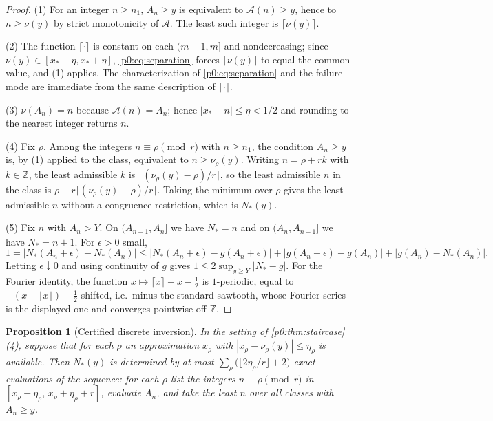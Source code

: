 \documentclass[11pt,a4paper,oneside]{book}
\theoremstyle{plain}
\newtheorem{proposition}[theorem]{Proposition}
\theoremstyle{definition}
\theoremstyle{remark}
\newcommand{\Int}{\mathbb{Z}}
\begin{document}
\begin{proof}
(1) For an integer $n\ge n_1$, $A_n\ge y$ is equivalent to
$\mathcal A(n)\ge y$, hence to $n\ge\nu(y)$ by strict monotonicity of
$\mathcal A$.  The least such integer is $\lceil\nu(y)\rceil$.

(2) The function $\lceil\cdot\rceil$ is constant on each $(m-1,m]$ and
nondecreasing; since $\nu(y)\in[x_\ast-\eta,x_\ast+\eta]$,
\eqref{p0:eq:separation} forces $\lceil\nu(y)\rceil$ to equal the common
value, and (1) applies.  The characterization of
\eqref{p0:eq:separation} and the failure mode are immediate from the same
description of $\lceil\cdot\rceil$.

(3) $\nu(A_n)=n$ because $\mathcal A(n)=A_n$; hence $|x_\ast-n|\le\eta<1/2$ and
rounding to the nearest integer returns $n$.

(4) Fix $\rho$.  Among the integers $n\equiv\rho\pmod r$ with $n\ge n_1$, the
condition $A_n\ge y$ is, by (1) applied to the class, equivalent to
$n\ge\nu_\rho(y)$.  Writing $n=\rho+rk$ with $k\in\Int$, the least admissible
$k$ is $\lceil(\nu_\rho(y)-\rho)/r\rceil$, so the least admissible $n$ in the
class is $\rho+r\lceil(\nu_\rho(y)-\rho)/r\rceil$.  Taking the minimum over
$\rho$ gives the least admissible $n$ without a congruence restriction, which
is $N_\ast(y)$.

(5) Fix $n$ with $A_n>Y$.  On $(A_{n-1},A_n]$ we have $N_\ast=n$ and on
$(A_n,A_{n+1}]$ we have $N_\ast=n+1$.  For $\epsilon>0$ small,
\[
 1=\bigl|N_\ast(A_n+\epsilon)-N_\ast(A_n)\bigr|
 \le\bigl|N_\ast(A_n+\epsilon)-g(A_n+\epsilon)\bigr|
  +\bigl|g(A_n+\epsilon)-g(A_n)\bigr|
  +\bigl|g(A_n)-N_\ast(A_n)\bigr| .
\]
Letting $\epsilon\downarrow0$ and using continuity of $g$ gives
$1\le2\sup_{y\ge Y}|N_\ast-g|$.  For the Fourier identity, the function
$x\mapsto\lceil x\rceil-x-\tfrac12$ is $1$-periodic, equal to
$-(x-\lfloor x\rfloor)+\tfrac12$ shifted, i.e.\ minus the standard sawtooth,
whose Fourier series is the displayed one and converges pointwise off
$\Int$.
\end{proof}

\begin{proposition}[Certified discrete inversion]\label{p0:prop:certified-rounding}
In the setting of \cref{p0:thm:staircase}(4), suppose that for each $\rho$ an
approximation $x_\rho$ with $|x_\rho-\nu_\rho(y)|\le\eta_\rho$ is available.
Then $N_\ast(y)$ is determined by at most
$\sum_\rho\bigl(\lfloor2\eta_\rho/r\rfloor+2\bigr)$ exact evaluations of the
sequence: for each $\rho$ list the integers $n\equiv\rho\pmod r$ in
$[x_\rho-\eta_\rho,\,x_\rho+\eta_\rho+r]$, evaluate $A_n$, and take the least
$n$ over all classes with $A_n\ge y$.
\end{proposition}
\end{document}
